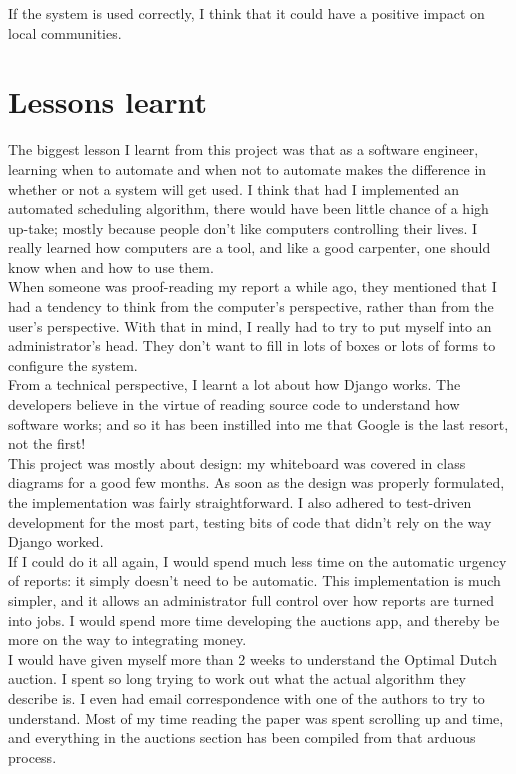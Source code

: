 If the system is used correctly, I think that it could have a positive impact on local communities.

\section{Lessons learnt}
The biggest lesson I learnt from this project was that as a software engineer, learning when to automate and when not to automate makes the difference in whether or not a system will get used. I think that had I implemented an automated scheduling algorithm, there would have been little chance of a high up-take; mostly because people don't like computers controlling their lives. I really learned how computers are a tool, and like a good carpenter, one should know when and how to use them. \\

When someone was proof-reading my report a while ago, they mentioned that I had a tendency to think from the computer's perspective, rather than from the user's perspective. With that in mind, I really had to try to put myself into an administrator's head. They don't want to fill in lots of boxes or lots of forms to configure the system. \\

From a technical perspective, I learnt a lot about how Django works. The developers believe in the virtue of reading source code to understand how software works; and so it has been instilled into me that Google is the last resort, not the first! \\

This project was mostly about design: my whiteboard was covered in class diagrams for a good few months. As soon as the design was properly formulated, the implementation was fairly straightforward. I also adhered to test-driven development for the most part, testing bits of code that didn't rely on the way Django worked. \\

If I could do it all again, I would spend much less time on the automatic urgency of reports: it simply doesn't need to be automatic. This implementation is much simpler, and it allows an administrator full control over how reports are turned into jobs. I would spend more time developing the auctions app, and thereby be more on the way to integrating money. \\

I would have given myself more than 2 weeks to understand the Optimal Dutch auction. I spent so long trying to work out what the actual algorithm they describe is. I even had email correspondence with one of the authors to try to understand. Most of my time reading the paper was spent scrolling up and time, and everything in the auctions section has been compiled from that arduous process.

